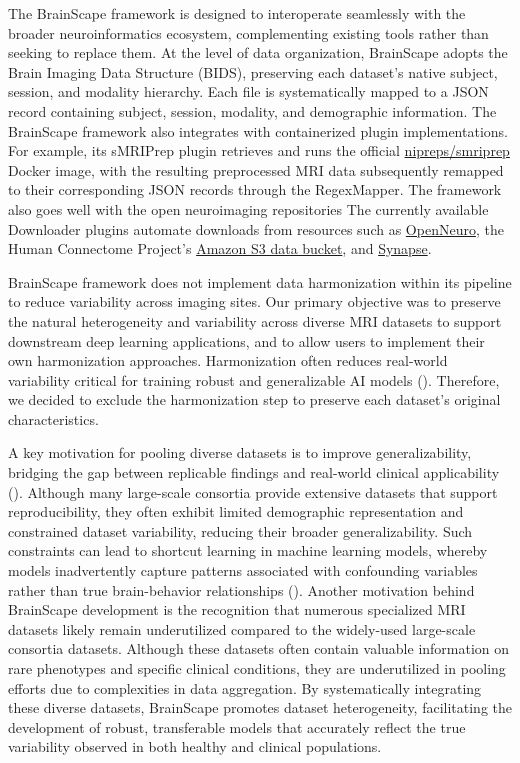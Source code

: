 The BrainScape framework is designed to interoperate seamlessly with the broader neuroinformatics ecosystem, 
complementing existing tools rather than seeking to replace them. 
At the level of data organization, BrainScape adopts the Brain Imaging Data Structure (BIDS), 
preserving each dataset's native subject, session, and modality hierarchy. 
Each file is systematically mapped to a JSON record containing subject, session, modality, and demographic information. 
The BrainScape framework also integrates with containerized plugin implementations. 
For example, its sMRIPrep plugin retrieves and runs the official \href{https://www.nipreps.org/smriprep/}{nipreps/smriprep} Docker image, 
with the resulting preprocessed MRI data subsequently remapped to their corresponding JSON records through the RegexMapper. 
The framework also goes well with the open neuroimaging repositories
The currently available Downloader plugins automate downloads from resources such as \href{https://openneuro.org/}{OpenNeuro}, 
the Human Connectome Project's \href{https://wiki.humanconnectome.org/docs/Using%20ConnectomeDB%20data%20on%20Amazon%20S3.html}{Amazon S3 data bucket}, 
and \href{https://www.synapse.org}{Synapse}. 

BrainScape framework does not implement data harmonization within its pipeline to reduce variability across imaging sites. 
Our primary objective was to preserve the natural heterogeneity and variability across diverse MRI datasets to support 
downstream deep learning applications, and to allow users to implement their own harmonization approaches. 
Harmonization often reduces real-world variability critical for training robust and 
generalizable AI models (\cite{adkinson2024brain}).
Therefore, we decided to exclude the harmonization step to preserve each dataset's original characteristics.

A key motivation for pooling diverse datasets is to improve generalizability, 
bridging the gap between replicable findings and real-world clinical applicability 
(\cite{marek2024replicability, adkinson2024brain, yang2024limits}).
Although many large-scale consortia provide extensive datasets that support reproducibility, 
they often exhibit limited demographic representation and constrained dataset variability, 
reducing their broader generalizability. 
Such constraints can lead to shortcut learning in machine learning models, 
whereby models inadvertently capture patterns associated with confounding variables 
rather than true brain-behavior relationships (\cite{marek2024replicability, yang2024limits}). 
Another motivation behind BrainScape development is the recognition that 
numerous specialized MRI datasets likely remain underutilized 
compared to the widely-used large-scale consortia datasets. 
Although these datasets often contain valuable information on rare phenotypes and specific clinical conditions, 
they are underutilized in pooling efforts due to complexities in data aggregation. 
By systematically integrating these diverse datasets, BrainScape promotes 
dataset heterogeneity, facilitating the development of robust, transferable models 
that accurately reflect the true variability observed in both healthy and clinical populations.


